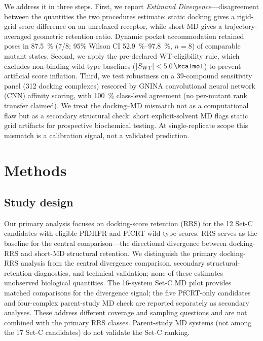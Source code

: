 \documentclass[journal=jcisd8,manuscript=article,layout=traditional]{achemso}
\begin{document}
We address it in three steps. First, we report \textit{Estimand Divergence}---disagreement between the quantities the two procedures estimate\citep{lundberg2021estimand}: static docking gives a rigid-grid score difference on an unrelaxed receptor, while short MD gives a trajectory-averaged geometric retention ratio. Dynamic pocket accommodation retained poses in \qty{87.5}{\percent} (7/8; 95\% Wilson CI \qtyrange{52.9}{97.8}{\percent}, $n=\num{8}$) of comparable mutant states. Second, we apply the pre-declared WT-eligibility rule, which excludes non-binding wild-type baselines ($|S_{\mathrm{WT}}| < \qty{5.0}{\kcalmol}$) to prevent artificial score inflation. Third, we test robustness on a 39-compound sensitivity panel (\num{312} docking complexes) rescored by GNINA convolutional neural network (CNN) affinity scoring, with \qty{100}{\percent} class-level agreement (no per-mutant rank transfer claimed). We treat the docking--MD mismatch not as a computational flaw but as a secondary structural check: short explicit-solvent MD flags static grid artifacts for prospective biochemical testing. At single-replicate scope this mismatch is a calibration signal, not a validated prediction.


\section{Methods}

\subsection{Study design}

Our primary analysis focuses on docking-score retention (RRS) for the 12 Set-C candidates with eligible PfDHFR and PfCRT wild-type scores. RRS serves as the baseline for the central comparison---the directional divergence between docking-RRS and short-MD structural retention. We distinguish the primary docking-RRS analysis from the central divergence comparison, secondary structural-retention diagnostics, and technical validation; none of these estimates unobserved biological quantities. The 16-system Set-C MD pilot provides matched comparisons for the divergence signal; the five PfCRT-only candidates and four-complex parent-study MD check are reported separately as secondary analyses. These address different coverage and sampling questions and are not combined with the primary RRS classes. Parent-study MD systems (not among the 17 Set-C candidates) do not validate the Set-C ranking.
\end{document}
